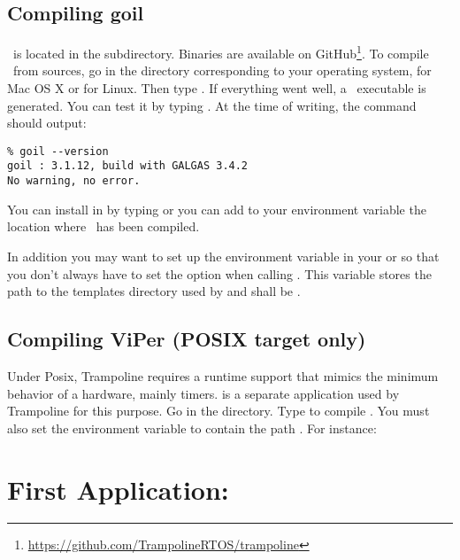 \subsection{Compiling goil}

\goil\ is located in the  subdirectory. Binaries are available on GitHub\footnote{\url{https://github.com/TrampolineRTOS/trampoline}}. To compile \goil\ from sources, go in the directory corresponding to your operating system,  for Mac OS X or  for Linux. Then type . If everything went well, a \goil\ executable is generated. You can test it by typing . At the time of writing, the command should output:

\begin{verbatim}
% goil --version
goil : 3.1.12, build with GALGAS 3.4.2
No warning, no error.
\end{verbatim}

You can install  in  by typing  or you can add to your  environment variable the location where \goil\ has been compiled.

In addition you may want to set up the  environment variable in your  or  so that you don't always have to set the  option when calling . This variable stores the path to the templates directory used by  and shall be .

\subsection{Compiling ViPer (POSIX target only)}

Under Posix, Trampoline requires a runtime support that mimics the minimum behavior of a hardware, mainly timers.  is a separate application used by Trampoline for this purpose. Go in the  directory. Type  to compile . You must also set the environment variable  to contain the path . For instance: 

\section{First Application: }

